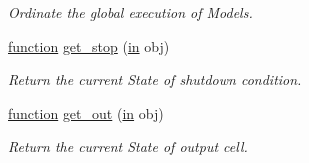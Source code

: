 \begin{DoxyCompactItemize}
\begin{DoxyCompactList}\small\item\em Ordinate the global execution of Models. \end{DoxyCompactList}\item 
\hyperlink{_plan__desuma_functions_8m_ac2ffb26d6f42d3bbcd7847b0873403f4}{function} \hyperlink{class_wrapper_aaba4a98b8b3bf391348722f0f227e333}{get\+\_\+stop} (\hyperlink{class_wrapper_a5e252d97ca5bf85c5753e2914673eead}{in} obj)
\begin{DoxyCompactList}\small\item\em Return the current State of shutdown condition. \end{DoxyCompactList}\item 
\hyperlink{_plan__desuma_functions_8m_ac2ffb26d6f42d3bbcd7847b0873403f4}{function} \hyperlink{class_wrapper_a15af7c208437e3c98d1f130b45a36a37}{get\+\_\+out} (\hyperlink{class_wrapper_a5e252d97ca5bf85c5753e2914673eead}{in} obj)
\begin{DoxyCompactList}\small\item\em Return the current State of output cell. \end{DoxyCompactList}\end{DoxyCompactItemize}
